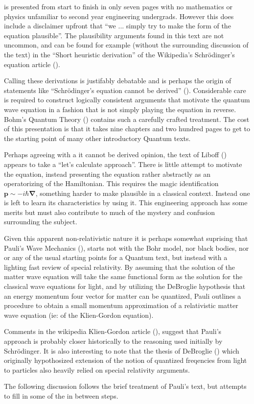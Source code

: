\documentclass[]{eliblog}
\newcommand{\Bp}[0]{\mathbf{p}}
\newcommand{\spacegrad}[0]{\boldsymbol{\nabla}}
\newcommand{\Schrodinger}[0]{Schr\"{o}dinger}
\begin{document}
is presented from start to finish in only seven pages with no mathematics or physics unfamiliar to second year engineering undergrads.  However this does include a disclaimer upfront that ``we ... simply try to make the form of the equation plausible''.  The plausibility arguments found in this text are not uncommon, and can be found for example (without the surrounding discussion of the text) in the ``Short heuristic derivation'' of the Wikipedia's \Schrodinger's equation article (\cite{wikiSchH}).

Calling these derivations is justifably debatable and is perhaps the origin of statements like ``\Schrodinger's equation cannot be derived'' (\cite{hyperphysicsSch}).
Considerable care is required to construct logically consistent arguments that motivate the quantum wave equation in a fashion that is not simply playing the equation in reverse.  Bohm's Quantum Theory (\cite{bohm1989qt}) contains such a carefully crafted treatment.  The cost of this presentation is that it takes nine chapters and two hundred pages to get to the starting point of many other introductory Quantum texts.

Perhaps agreeing with a it cannot be derived opinion, the text of Liboff (\cite{liboff2003iqm}) appears to take a ``let's calculate approach''.  There is little attempt to motivate the equation, instead presenting the equation rather abstractly as an operatorizing of the Hamiltonian.  This requires the magic identification $\Bp \sim -i \hbar \spacegrad$, something harder to make plausible in a classical context.
Instead one is left to learn its characteristics by using it.  This engineering approach has some merits but must also contribute to much of the mystery and confusion surrounding the subject.

Given this apparent non-relativistic nature it is perhaps somewhat suprising that Pauli's Wave Mechanics (\cite{pauli2000wm}), starts not with the Bohr model, nor black bodies, nor or any of the usual starting points for a Quantum text, but instead with a lighting fast review of special relativity.   By assuming that the solution of the matter wave equation will take the same functional form as the solution for the classical wave equations for light, and by utilizing the DeBroglie hypothesis that an energy momentum four vector for matter can be quantized, Pauli outlines a procedure to obtain a small momentum approximation of a relativistic matter wave equation (ie: of the Klien-Gordon equation).

Comments in the wikipedia Klien-Gordon article (\cite{wikiKG}), suggest that Pauli's approach is probably closer historically to the reasoning used initially by \Schrodinger.  It is also interesting to note that the thesis of DeBroglie (\cite{AFkracklauerDeBroglie}) which originally hypothosized extension of the notion of quantized freqencies from light to particles also heavily relied on special relativity arguments.

The following discussion follows the brief treatment of Pauli's text, but attempts to fill in some of the in between steps.



\end{document}
